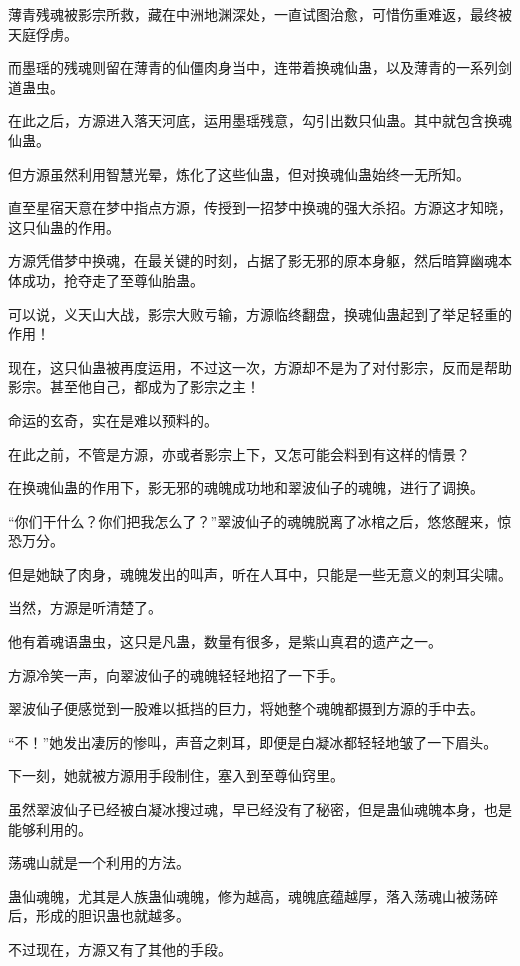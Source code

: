 \begin{this_body}
薄青残魂被影宗所救，藏在中洲地渊深处，一直试图治愈，可惜伤重难返，最终被天庭俘虏。

而墨瑶的残魂则留在薄青的仙僵肉身当中，连带着换魂仙蛊，以及薄青的一系列剑道蛊虫。

在此之后，方源进入落天河底，运用墨瑶残意，勾引出数只仙蛊。其中就包含换魂仙蛊。

但方源虽然利用智慧光晕，炼化了这些仙蛊，但对换魂仙蛊始终一无所知。

直至星宿天意在梦中指点方源，传授到一招梦中换魂的强大杀招。方源这才知晓，这只仙蛊的作用。

方源凭借梦中换魂，在最关键的时刻，占据了影无邪的原本身躯，然后暗算幽魂本体成功，抢夺走了至尊仙胎蛊。

可以说，义天山大战，影宗大败亏输，方源临终翻盘，换魂仙蛊起到了举足轻重的作用！

现在，这只仙蛊被再度运用，不过这一次，方源却不是为了对付影宗，反而是帮助影宗。甚至他自己，都成为了影宗之主！

命运的玄奇，实在是难以预料的。

在此之前，不管是方源，亦或者影宗上下，又怎可能会料到有这样的情景？

在换魂仙蛊的作用下，影无邪的魂魄成功地和翠波仙子的魂魄，进行了调换。

“你们干什么？你们把我怎么了？”翠波仙子的魂魄脱离了冰棺之后，悠悠醒来，惊恐万分。

但是她缺了肉身，魂魄发出的叫声，听在人耳中，只能是一些无意义的刺耳尖啸。

当然，方源是听清楚了。

他有着魂语蛊虫，这只是凡蛊，数量有很多，是紫山真君的遗产之一。

方源冷笑一声，向翠波仙子的魂魄轻轻地招了一下手。

翠波仙子便感觉到一股难以抵挡的巨力，将她整个魂魄都摄到方源的手中去。

“不！”她发出凄厉的惨叫，声音之刺耳，即便是白凝冰都轻轻地皱了一下眉头。

下一刻，她就被方源用手段制住，塞入到至尊仙窍里。

虽然翠波仙子已经被白凝冰搜过魂，早已经没有了秘密，但是蛊仙魂魄本身，也是能够利用的。

荡魂山就是一个利用的方法。

蛊仙魂魄，尤其是人族蛊仙魂魄，修为越高，魂魄底蕴越厚，落入荡魂山被荡碎后，形成的胆识蛊也就越多。

不过现在，方源又有了其他的手段。


\end{this_body}
